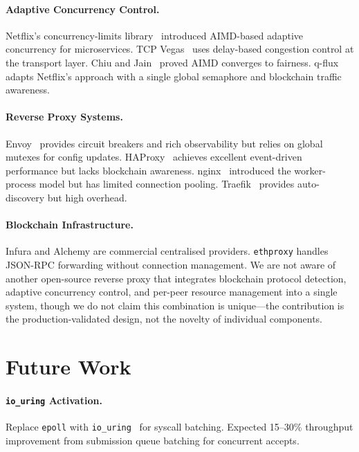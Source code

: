 \documentclass[a4paper, 11pt]{article}
\begin{document}
\paragraph{Adaptive Concurrency Control.}
Netflix's concurrency-limits library~\cite{netflix-cl} introduced AIMD-based adaptive concurrency for microservices. TCP Vegas~\cite{tcpvegas} uses delay-based congestion control at the transport layer. Chiu and Jain~\cite{aimd} proved AIMD converges to fairness. q-flux adapts Netflix's approach with a single global semaphore and blockchain traffic awareness.

\paragraph{Reverse Proxy Systems.}
Envoy~\cite{envoy} provides circuit breakers and rich observability but relies on global mutexes for config updates. HAProxy~\cite{haproxy} achieves excellent event-driven performance but lacks blockchain awareness. nginx~\cite{nginx} introduced the worker-process model but has limited connection pooling. Traefik~\cite{traefik} provides auto-discovery but high overhead.

\paragraph{Blockchain Infrastructure.}
Infura and Alchemy are commercial centralised providers. \texttt{ethproxy} handles JSON-RPC forwarding without connection management. We are not aware of another open-source reverse proxy that integrates blockchain protocol detection, adaptive concurrency control, and per-peer resource management into a single system, though we do not claim this combination is unique---the contribution is the production-validated design, not the novelty of individual components.


\section{Future Work}
\label{sec:future}

\paragraph{\texttt{io\_uring} Activation.}
Replace \texttt{epoll} with \texttt{io\_uring}~\cite{iouring} for syscall batching. Expected 15--30\% throughput improvement from submission queue batching for concurrent accepts.
\end{document}

